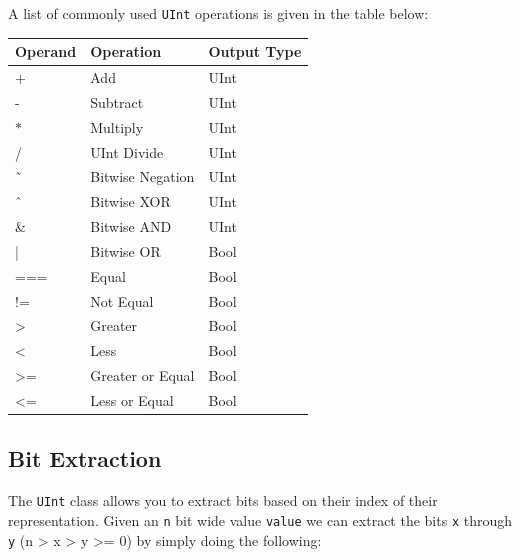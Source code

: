 A list of commonly used \verb+UInt+ operations is given in the table below:

\begin{center}
\begin{tabular}{| l | l | l | }
\hline
{\bf Operand} & {\bf Operation} & {\bf Output Type} \\ \hline
+ & Add & UInt  \\ \hline
- & Subtract & UInt  \\ \hline
$\ast$ & Multiply & UInt \\ \hline
/ & UInt Divide & UInt \\ \hline
\~\ & Bitwise Negation & UInt \\ \hline
\^\ & Bitwise XOR & UInt\\ \hline
\& & Bitwise AND & UInt \\ \hline
 | & Bitwise OR & Bool \\ \hline
=== & Equal & Bool \\ \hline
!= & Not Equal & Bool \\ \hline
> & Greater & Bool \\ \hline
< & Less & Bool \\ \hline
>= & Greater or Equal & Bool \\ \hline
<= & Less or Equal & Bool \\ \hline
\end{tabular}
\end{center}

% 
% 

\subsection{Bit Extraction}

The \verb+UInt+ class allows you to extract bits based on their index of their representation. Given an \verb+n+ bit wide value \verb+value+ we can extract the bits \verb+x+ through \verb+y+ (n > x > y >= 0) by simply doing the following:

